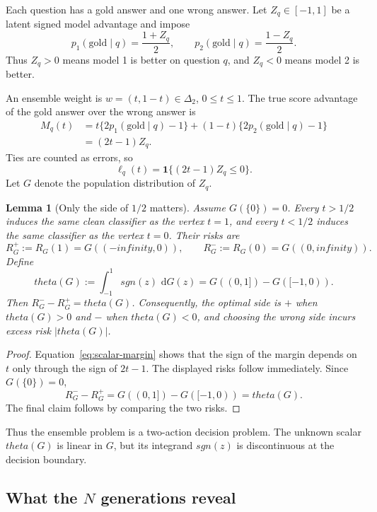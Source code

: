 \documentclass[11pt]{article}
\def\theta{theta}%
\def\sgn{sgn}%
\def\infty{infinity}%
\newtheorem{lemma}[theorem]{Lemma}
\newcommand{\one}{\mathbf 1}
\newcommand{\sgn}{\operatorname{sgn}}
\newcommand{\dd}{\,\mathrm d}
\begin{document}
Each question has a gold answer and one wrong answer.  Let $Z_q\in[-1,1]$ be a latent signed model advantage and impose
\begin{equation}
\label{eq:antisymmetric-probs}
 p_1(\text{gold}\mid q)=\frac{1+Z_q}{2},
 \qquad
 p_2(\text{gold}\mid q)=\frac{1-Z_q}{2}.
\end{equation}
Thus $Z_q>0$ means model 1 is better on question $q$, and $Z_q<0$ means model 2 is better.

An ensemble weight is $w=(t,1-t)\in\Delta_2$, $0\le t\le1$.  The true score advantage of the gold answer over the wrong answer is
\begin{align}
M_q(t)
&=t\{2p_1(\text{gold}\mid q)-1\}
 +(1-t)\{2p_2(\text{gold}\mid q)-1\}\\
&=(2t-1)Z_q.
\label{eq:scalar-margin}
\end{align}
Ties are counted as errors, so
\[
\ell_q(t)=\one\{(2t-1)Z_q\le0\}.
\]
Let $G$ denote the population distribution of $Z_q$.

\begin{lemma}[Only the side of $1/2$ matters]
\label{lem:two-actions}
Assume $G(\{0\})=0$.  Every $t>1/2$ induces the same clean classifier as the vertex $t=1$, and every $t<1/2$ induces the same classifier as the vertex $t=0$.  Their risks are
\[
R_G^+:=R_G(1)=G((-\infty,0)),
\qquad
R_G^-:=R_G(0)=G((0,\infty)).
\]
Define
\begin{equation}
\label{eq:theta-def}
\theta(G):=\int_{-1}^1\sgn(z)\,\dd G(z)
=G((0,1])-G([-1,0)).
\end{equation}
Then $R_G^- -R_G^+=\theta(G)$.  Consequently, the optimal side is $+$ when $\theta(G)>0$ and $-$ when $\theta(G)<0$, and choosing the wrong side incurs excess risk $|\theta(G)|$.
\end{lemma}

\begin{proof}
Equation~\eqref{eq:scalar-margin} shows that the sign of the margin depends on $t$ only through the sign of $2t-1$.  The displayed risks follow immediately.  Since $G(\{0\})=0$,
\[
R_G^- -R_G^+
=G((0,1])-G([-1,0))
=\theta(G).
\]
The final claim follows by comparing the two risks.
\end{proof}

Thus the ensemble problem is a two-action decision problem.  The unknown scalar $\theta(G)$ is linear in $G$, but its integrand $\sgn(z)$ is discontinuous at the decision boundary.

\subsection{What the $N$ generations reveal}
\end{document}
